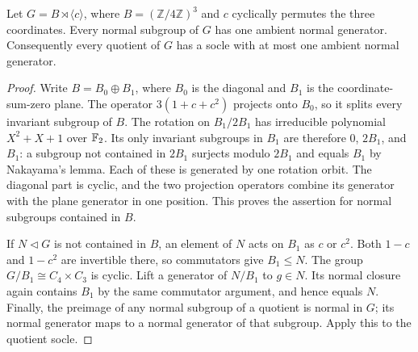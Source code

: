 \begin{lemma}
\label{lem:quaternary-ternary-normal-generators}
Let $G=B\rtimes\langle c\rangle$, where
$B=(\mathbb Z/4\mathbb Z)^3$ and $c$ cyclically permutes the three
coordinates. Every normal subgroup of $G$ has one ambient normal
generator. Consequently every quotient of $G$ has a socle with at
most one ambient normal generator.
\end{lemma}
\begin{proof}
Write $B=B_0\oplus B_1$, where $B_0$ is the diagonal and $B_1$
is the coordinate-sum-zero plane. The operator $3(1+c+c^2)$
projects onto $B_0$, so it splits every invariant subgroup of $B$.
The rotation on $B_1/2B_1$ has irreducible polynomial $X^2+X+1$
over $\mathbb F_2$. Its only invariant subgroups in $B_1$ are therefore
$0$, $2B_1$, and $B_1$: a subgroup not contained in $2B_1$
surjects modulo $2B_1$ and equals $B_1$ by Nakayama's lemma.
Each of these is generated by one rotation orbit. The diagonal
part is cyclic, and the two projection operators combine its
generator with the plane generator in one position. This proves
the assertion for normal subgroups contained in $B$.

If $N\lhd G$ is not contained in $B$, an element of $N$ acts on
$B_1$ as $c$ or $c^2$. Both $1-c$ and $1-c^2$ are invertible
there, so commutators give $B_1\leq N$. The group
$G/B_1\cong C_4\times C_3$ is cyclic. Lift a generator of
$N/B_1$ to $g\in N$. Its normal closure again contains $B_1$
by the same commutator argument, and hence equals $N$.
Finally, the preimage of any normal subgroup of a quotient is
normal in $G$; its normal generator maps to a normal generator
of that subgroup. Apply this to the quotient socle.
\end{proof}

